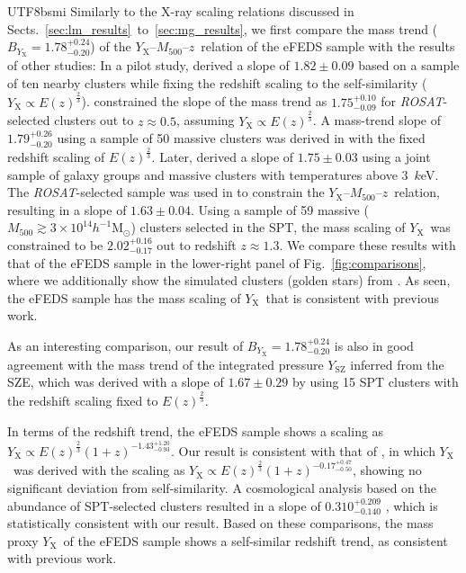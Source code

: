 \documentclass[longauth]{aa}
\newcommand{\Msunh}{\ensuremath{h^{-1}\mathrm{M}_{\odot}}}
\newcommand{\Mfiveoo}{\ensuremath{M_{500}}}
\newcommand{\redshift}{\ensuremath{z}}
\newcommand{\ROSAT}{\emph{ROSAT}}
\newcommand{\Yx}{\ensuremath{Y_{\mathrm{X}}}}
\newcommand{\By}{\ensuremath{B_{Y_{\mathrm{X}}}}}
\newcommand{\ansBy}{\ensuremath{ 1.78^{+0.24}_{-0.20} }}
\newcommand{\ansgammay}{\ensuremath{ -1.43^{+1.20}_{-0.93} }}
\begin{document}
\begin{CJK*}{UTF8}{bsmi}
Similarly to the X-ray scaling relations discussed in Sects.~\ref{sec:lm_results}~to~\ref{sec:mg_results}, we first compare the mass trend ($\By = \ansBy$) of the \Yx--\Mfiveoo--\redshift\ relation of the eFEDS sample with the results of other studies:
In a pilot study, \cite{arnaud07} derived a slope of $1.82\pm0.09$ based on a sample of ten nearby clusters while fixing the redshift scaling to the self-similarity ($\Yx\propto{E(\redshift)}^{\frac{2}{3}}$).
\cite{vikhlinin09a} constrained the slope of the mass trend as $1.75^{+0.10}_{-0.09}$ for \ROSAT-selected clusters out to $\redshift\approx0.5$, assuming $\Yx\propto{E(\redshift)}^{\frac{2}{3}}$.
A mass-trend slope of $1.79^{+0.26}_{-0.20}$ using a sample of 50 massive clusters was derived in \cite{mahdavi13} with the fixed redshift scaling of $E(\redshift)^{\frac{2}{3}}$.
Later, \cite{lovisari15} derived a slope of $1.75\pm0.03$ using a joint sample of galaxy groups and massive clusters with temperatures above $3$~$k$eV. 
The \ROSAT-selected sample was used in \cite{mantz16b} to constrain the \Yx--\Mfiveoo--\redshift\ relation, resulting in a slope of $1.63\pm0.04$.
Using a sample of 59 massive ($\Mfiveoo\gtrsim3\times10^{14}\Msunh$) clusters selected in the SPT, the mass scaling of \Yx\ was constrained to be $2.02^{+0.16}_{-0.17}$ out to redshift $\redshift\approx1.3$.
We compare these results with that of the eFEDS sample in the lower-right panel of Fig.~\ref{fig:comparisons}, where we additionally show the simulated clusters (golden stars) from \cite{barnes17}.
As seen, the eFEDS sample has the mass scaling of \Yx\ that is consistent with previous work.


As an interesting comparison, our result of $\By = \ansBy$ is also in good agreement with the mass trend of the integrated pressure $Y_{\mathrm{SZ}}$ inferred from the SZE, which was derived with a slope of $1.67\pm0.29$ by \cite{andersson11} using 15 SPT clusters with the redshift scaling fixed to $E(\redshift)^{\frac{2}{3}}$.


In terms of the redshift trend, the eFEDS sample shows a scaling as $\Yx\propto{E(\redshift)}^{\frac{2}{3}}(1 + \redshift)^{\ansgammay}$.
Our result is consistent with that of 
\cite{bulbul19}, in which \Yx\ was derived with the scaling as $\Yx\propto{E(\redshift)}^{\frac{2}{3}}(1 + \redshift)^{-0.17^{+0.47}_{-0.50}}$, showing no significant deviation from self-similarity.
A cosmological analysis based on the abundance of SPT-selected clusters resulted in a slope of $0.310^{+0.209}_{-0.140}$ \citep{bocquet19}, which is statistically consistent with our result.
Based on these comparisons, the mass proxy \Yx\ of the eFEDS sample shows a self-similar redshift trend, as consistent with previous work.



\end{CJK*}
\end{document}
